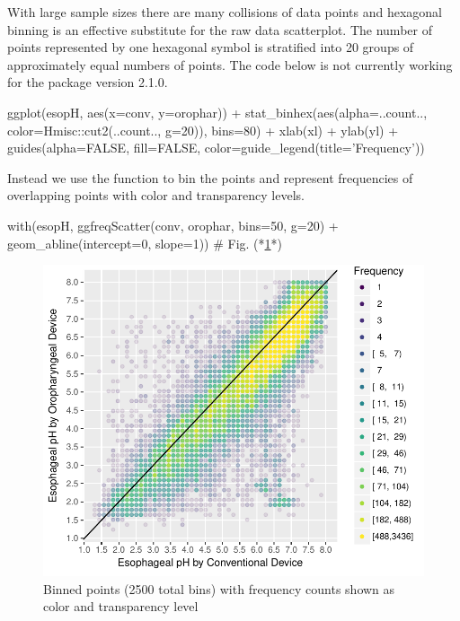 With large sample sizes there are many collisions of data points and
hexagonal binning is an effective substitute for the raw
data scatterplot.  The number of points represented by one hexagonal
symbol is stratified into 20 groups of approximately equal numbers of
points.  The code below is not currently working for the 
package version 2.1.0. 
\begin{Schunk}
\begin{Sinput}
ggplot(esopH, aes(x=conv, y=orophar)) +
  stat_binhex(aes(alpha=..count.., color=Hmisc::cut2(..count.., g=20)),
              bins=80) +
  xlab(xl) + ylab(yl) +
  guides(alpha=FALSE, fill=FALSE, color=guide_legend(title='Frequency'))
\end{Sinput}
\end{Schunk}
Instead we use the   function to bin the
points and represent frequencies of overlapping points with color and
transparency levels. 
\begin{Schunk}
\begin{Sinput}
with(esopH, ggfreqScatter(conv, orophar, bins=50, g=20) +
              geom_abline(intercept=0, slope=1))   # Fig. (*\ref{fig:descript-pHh2}*)
\end{Sinput}
\begin{figure}[htbp]

\centerline{\includegraphics{descript-pHh2-1} }

\caption[Binned points (2500 total bins) with frequency counts shown as color and transparency level]{Binned points (2500 total bins) with frequency counts shown as color and transparency level}\label{fig:descript-pHh2}
\end{figure}
\end{Schunk}

